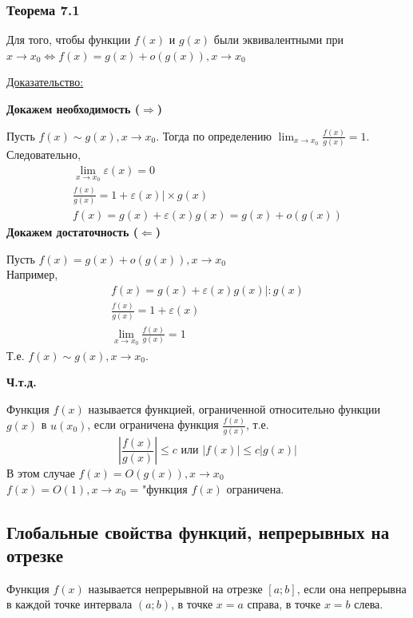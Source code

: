 \documentclass[12pt]{article}
\begin{document}
    \subsubsection*{Теорема 7.1}
    Для того, чтобы функции $f(x)$ и $g(x)$ были эквивалентными при $x \to x_0 \Leftrightarrow f(x) = g(x) + o(g(x)), x \to x_0$\par\noindent
    \underline{Доказательство:}
    \begin{adjustwidth}{1.5em}{1.5em}
        \textbf{Докажем необходимость ($\Rightarrow$)}\par\noindent
        Пусть $f(x) \sim g(x), x \to x_0$. Тогда по определению $\lim_{x \to x_0}\frac{f(x)}{g(x)} = 1$.\\
        Следовательно, \begin{gather*}
            \lim_{x\to x_0}\varepsilon(x) = 0\\
            \frac{f(x)}{g(x)} = 1 + \varepsilon(x) \Big| \times g(x)\\
            f(x) = g(x) + \varepsilon(x) g(x) = g(x) + o(g(x))
        \end{gather*}\noindent
        \textbf{Докажем достаточность ($\Leftarrow$)}\par\noindent
        Пусть $f(x) = g(x) + o(g(x)), x \to x_0$\\
        Например, 
        \begin{gather*}
            f(x) = g(x) + \varepsilon(x) g(x) \Big| : g(x)\\
            \frac{f(x)}{g(x)} = 1 + \varepsilon(x)\\
            \lim_{x \to x_0} \frac{f(x)}{g(x)} = 1
        \end{gather*}
        Т.е. $f(x) \sim g(x), x \to x_0$.
        \begin{center}
            \textbf{Ч.т.д.}
        \end{center}
    \end{adjustwidth}

    Функция $f(x)$ называется функцией, ограниченной относительно функции $g(x)$ в $u(x_0)$, если ограничена функция $\frac{f(x)}{g(x)}$, т.е.
    \[ \left|\frac{f(x)}{g(x)}\right| \le c \text{ или } \left|f(x)\right| \le c\left|g(x)\right| \]
    В этом случае $f(x) = O(g(x)), x \to x_0$\\
    $f(x) = O(1), x \to x_0$ = "функция $f(x)$ ограничена.

    \subsection{Глобальные свойства функций, непрерывных на отрезке}
    \noindent Функция $f(x)$ называется непрерывной на отрезке $[a; b]$, если она непрерывна в каждой точке интервала $(a; b)$, в точке $x = a$ справа, в точке $x = b$ слева.
\end{document}
